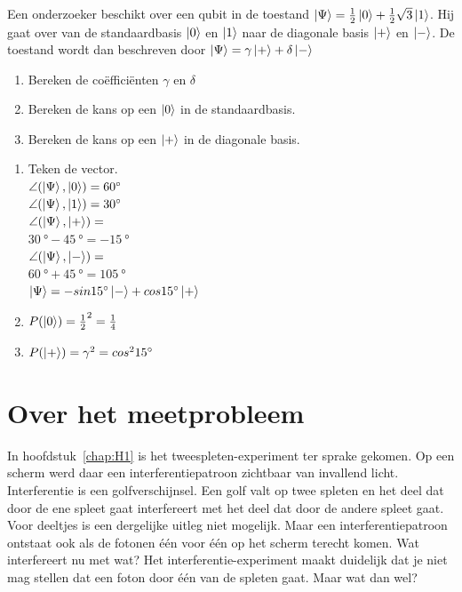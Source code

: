 \documentclass[../../main.tex]{subfiles}
\begin{document}
\begin{opdracht}\label{opd:basiscoef}
Een onderzoeker beschikt over een qubit in de toestand $\ket{\Psi} = \tfrac{1}{2} \ket{0} +\tfrac{1}{2}\sqrt{3}\ket{1}$. Hij gaat over van de standaardbasis $\ket{0}$ en $\ket{1}$ naar de diagonale basis  $\ket{+}$ en $\ket{-}$. De toestand wordt dan beschreven door $\ket{\Psi} = \gamma\ket{+} +\delta\ket{-}$

\begin{enumerate}
\item Bereken de coëfficiënten $\gamma$ en $\delta$
\item Bereken de kans op een $\ket{0}$ in de standaardbasis.
\item Bereken de kans  op een $\ket{+}$  in de diagonale basis.
\end{enumerate}
\end{opdracht}
\begin{antwoord}[-6cm]
\begin{enumerate}[wide, labelwidth=!, labelindent=0pt]
\item  Teken de vector.\\
$\angle(\ket{\Psi},\ket{0})=\SI{60}{\degree}$\\
$\angle(\ket{\Psi},\ket{1})=\SI{30}{\degree}$\\
$\angle(\ket{\Psi},\ket{+})=$\\
$\SI{30}{\degree}-\SI{45}{\degree}=\SI{-15}{\degree}$\\
$\angle(\ket{\Psi},\ket{-})=$\\
$\SI{60}{\degree}+\SI{45}{\degree}=\SI{105}{\degree}$\\
$\ket{\Psi}= -sin\SI{15}{\degree}\ket{-}+cos\SI{15}{\degree}\ket{+}$\\
\item $P(\ket{0})={\tfrac{1}{2}}^2= \tfrac{1}{4}$
\item $P(\ket{+})=\gamma^2= cos^2 \SI{15}{\degree}$
\end{enumerate}
\end{antwoord}
\section{Over het meetprobleem}\label{sec:meetprobleem}
In hoofdstuk~\ref{chap:H1} is het tweespleten-experiment ter sprake gekomen. Op een scherm werd daar een interferentiepatroon zichtbaar van invallend licht. Interferentie is een golfverschijnsel. Een golf valt op twee spleten en het deel dat door de ene spleet gaat interfereert met het  deel dat door de andere spleet gaat. Voor deeltjes is een dergelijke uitleg niet mogelijk. Maar een  interferentiepatroon ontstaat ook als de fotonen \'e\'en  voor \'e\'en op het scherm terecht komen. Wat interfereert nu met wat? 
Het interferentie-experiment maakt duidelijk dat je niet mag stellen dat een foton door \'e\'en van de spleten gaat. Maar wat dan wel? 
\end{document}
